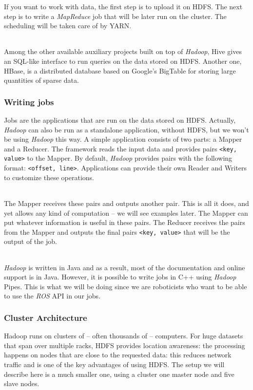 \documentclass[a4paper, 12pt]{article}
\begin{document}
If you want to work with data, the first step is to upload it on HDFS. The next step is to write a \textit{MapReduce} job that will be later run on the cluster. The scheduling will be taken care of by YARN.

~\\
Among the other available auxiliary projects built on top of \textit{Hadoop}, Hive gives an SQL-like interface to run queries on the data stored on HDFS. Another one, HBase, is a distributed database based on Google's BigTable for storing large quantities of sparse data.

    \subsubsection{Writing jobs}

Jobs are the applications that are run on the data stored on HDFS. Actually, \textit{Hadoop} can also be run as a standalone application, without HDFS, but we won't be using \textit{Hadoop} this way. A simple application consists of two parts: a Mapper and a Reducer. The framework reads the input data and provides pairs \texttt{<key, value>} to the Mapper. By default, \textit{Hadoop} provides pairs with the following format: \texttt{<offset, line>}. Applications can provide their own Reader and Writers to customize these operations.

~\\
The Mapper receives these pairs and outputs another pair. This is all it does, and yet allows any kind of computation -- we will see examples later. The Mapper can put whatever information is useful in these pairs. The Reducer receives the pairs from the Mapper and outputs the final pairs \texttt{<key, value>} that will be the output of the job.

~\\
\textit{Hadoop} is written in Java and as a result, most of the documentation and online support is in Java. However, it is possible to write jobs in C++ using \textit{Hadoop} Pipes. This is what we will be doing since we are roboticists who want to be able to use the \textit{ROS} API in our jobs.

    \subsubsection{Cluster Architecture}

Hadoop runs on clusters of -- often thousands of -- computers. For huge datasets that span over multiple racks, HDFS provides location awareness: the processing happens on nodes that are close to the requested data: this reduces network traffic and is one of the key advantages of using HDFS. The setup we will describe here is a much smaller one, using a cluster one master node and five slave nodes.
\end{document}
